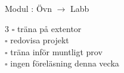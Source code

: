 
    Modul : Övn  $\rightarrow$ Labb 
    \begin{multicols}{3}\SlideFontTiny
    $\square$ träna på extentor \\
$\square$ redovisa projekt \\
$\square$ träna inför muntligt prov \\
$\square$ ingen föreläsning denna vecka \\
    \end{multicols}
    